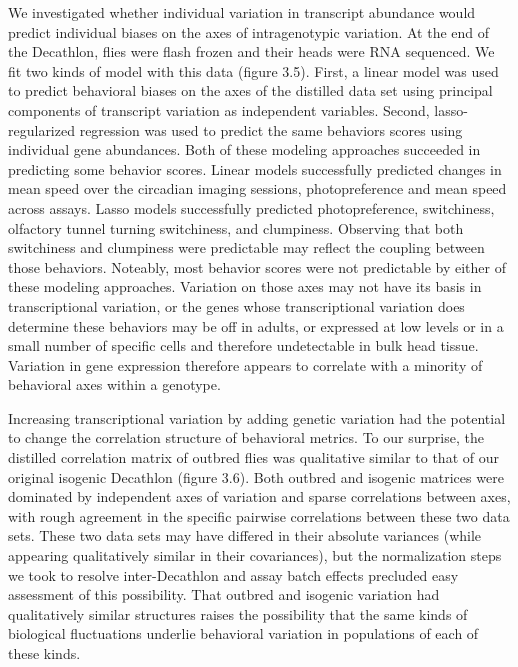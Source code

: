 \documentclass[12pt,letterpaper]{article}
\begin{document}
We investigated whether individual variation in transcript abundance would predict individual biases on the axes of intragenotypic variation. At the end of the Decathlon, flies were flash frozen and their heads were RNA sequenced. We fit two kinds of model with this data (figure 3.5). First, a linear model was used to predict behavioral biases on the axes of the distilled data set using principal components of transcript variation as independent variables. Second, lasso-regularized regression was used to predict the same behaviors scores using individual gene abundances. Both of these modeling approaches succeeded in predicting some behavior scores. Linear models successfully predicted changes in mean speed over the circadian imaging sessions, photopreference and mean speed across assays. Lasso models successfully predicted photopreference, switchiness, olfactory tunnel turning switchiness, and clumpiness. Observing that both switchiness and clumpiness were predictable may reflect the coupling between those behaviors. Noteably, most behavior scores were not predictable by either of these modeling approaches. Variation on those axes may not have its basis in transcriptional variation, or the genes whose transcriptional variation does determine these behaviors may be off in adults, or expressed at low levels or in a small number of specific cells and therefore undetectable in bulk head tissue. Variation in gene expression therefore appears to correlate with a minority of behavioral axes within a genotype.

Increasing transcriptional variation by adding genetic variation had the potential to change the correlation structure of behavioral metrics. To our surprise, the distilled correlation matrix of outbred flies was qualitative similar to that of our original isogenic Decathlon (figure 3.6). Both outbred and isogenic matrices were dominated by independent axes of variation and sparse correlations between axes, with rough agreement in the specific pairwise correlations between these two data sets. These two data sets may have differed in their absolute variances (while appearing qualitatively similar in their covariances), but the normalization steps we took to resolve inter-Decathlon and assay batch effects precluded easy assessment of this possibility. That outbred and isogenic variation had qualitatively similar structures raises the possibility that the same kinds of biological fluctuations underlie behavioral variation in populations of each of these kinds. 
\end{document}
